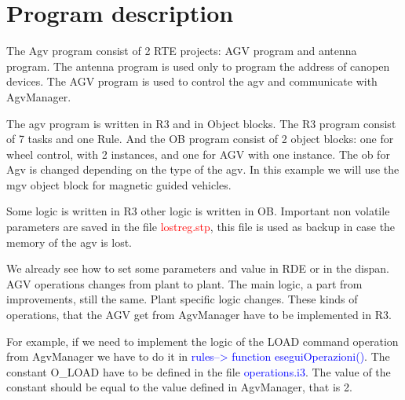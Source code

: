 \section{Program description}
The Agv program consist of 2 RTE projects: AGV program and antenna program. The antenna program is used only to program the address of canopen devices. The AGV program is used to control the agv and communicate with AgvManager.

The agv program is written in R3 and in Object blocks. The R3 program consist of 7 tasks and one Rule. And the OB program consist of 2 object blocks: one for wheel control, with 2 instances, and one for AGV with one instance. The ob for Agv is changed depending on the type of the agv. In this example we will use the mgv object block for magnetic guided vehicles.

Some logic is written in R3 other logic is written in OB. Important non volatile parameters are saved in the file \textcolor{red}{lostreg.stp}, this file is used as backup in case the memory of the agv is lost.

We already see how to set some parameters and value in RDE or in the dispan. AGV operations changes from plant to plant. The main logic, a part from improvements, still the same. Plant specific logic changes. These kinds of operations, that the AGV get from AgvManager have to be implemented in R3.

For example, if we need to implement the logic of the LOAD command operation from AgvManager we have to do it in \textcolor{blue}{rules--> function eseguiOperazioni()}. The constant O\_LOAD have to be defined in the file \textcolor{blue}{operations.i3}. The value of the constant should be equal to the value defined in AgvManager, that is 2.



